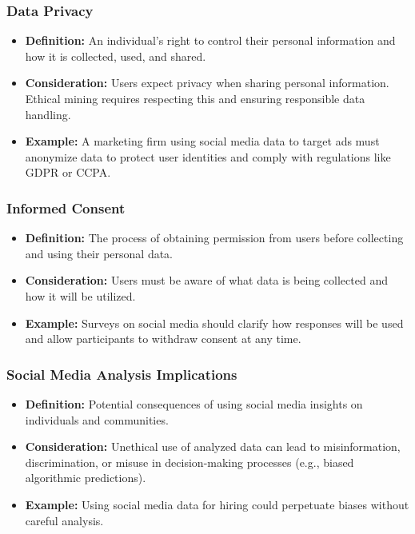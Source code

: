\documentclass{beamer}
\begin{document}
\begin{frame}[fragile]
    \frametitle{Data Privacy}
    \begin{itemize}
        \item \textbf{Definition:} An individual's right to control their personal information and how it is collected, used, and shared.
        \item \textbf{Consideration:} Users expect privacy when sharing personal information. Ethical mining requires respecting this and ensuring responsible data handling.
        \item \textbf{Example:} A marketing firm using social media data to target ads must anonymize data to protect user identities and comply with regulations like GDPR or CCPA.
    \end{itemize}
\end{frame}

\begin{frame}[fragile]
    \frametitle{Informed Consent}
    \begin{itemize}
        \item \textbf{Definition:} The process of obtaining permission from users before collecting and using their personal data.
        \item \textbf{Consideration:} Users must be aware of what data is being collected and how it will be utilized.
        \item \textbf{Example:} Surveys on social media should clarify how responses will be used and allow participants to withdraw consent at any time.
    \end{itemize}
\end{frame}

\begin{frame}[fragile]
    \frametitle{Social Media Analysis Implications}
    \begin{itemize}
        \item \textbf{Definition:} Potential consequences of using social media insights on individuals and communities.
        \item \textbf{Consideration:} Unethical use of analyzed data can lead to misinformation, discrimination, or misuse in decision-making processes (e.g., biased algorithmic predictions).
        \item \textbf{Example:} Using social media data for hiring could perpetuate biases without careful analysis.
    \end{itemize}
\end{frame}
\end{document}
